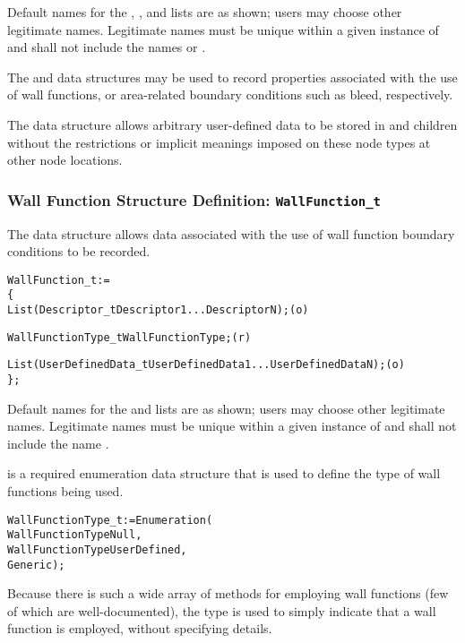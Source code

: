 \begin{notes}
\item
 Default names for the , , and
 lists are as shown; users may choose other legitimate names.
 Legitimate names must be unique within a given instance of
  and shall not include the names  or
 .
\end{notes}

The  and  data structures may be
used to record properties associated with the use of wall functions, or
area-related boundary conditions such as bleed, respectively.

The  data structure allows arbitrary
user-defined data to be stored in  and
 children without the restrictions or implicit
meanings imposed on these node types at other node locations.

\subsubsection{Wall Function Structure Definition: \texttt{WallFunction\_t}}
\label{s:WallFunction}

The  data structure allows data associated with
the use of wall function boundary conditions to be recorded.

\begin{alltt}
  WallFunction\_t :=
    \{
    List( Descriptor\_t  Descriptor1 ... DescriptorN ) ;                     (o)

    WallFunctionType\_t WallFunctionType ;                                   (r)

    List( UserDefinedData\_t UserDefinedData1 ... UserDefinedDataN ) ;       (o)
    \} ;
\end{alltt}

\begin{notes}
\item
 Default names for the  and 
 lists are as shown; users may choose other legitimate names.
 Legitimate names must be unique within a given instance of
  and shall not include the name
 .
\end{notes}

 is a required enumeration data structure
that is used to define the type of wall functions being used.
\begin{alltt}
  WallFunctionType\_t := Enumeration(
    WallFunctionTypeNull,
    WallFunctionTypeUserDefined,
    Generic ) ;
\end{alltt}
Because there is such a wide array of methods for employing wall
functions (few of which are well-documented), the type 
is used to simply indicate that a wall function is employed, without
specifying details.

